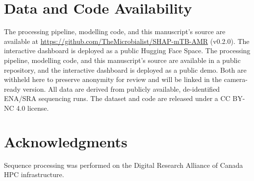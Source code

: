 \section*{Data and Code Availability}

\ifdefined\isaccepted
The processing pipeline, modelling code, and this manuscript's source are available at \url{https://github.com/TheMicrobialist/SHAP-mTB-AMR} (v0.2.0). The interactive dashboard is deployed as a public Hugging Face Space.
\else
The processing pipeline, modelling code, and this manuscript's source are available in a public repository, and the interactive dashboard is deployed as a public demo. Both are withheld here to preserve anonymity for review and will be linked in the camera-ready version.
\fi
All data are derived from publicly available, de-identified ENA/SRA sequencing runs. The dataset and code are released under a CC BY-NC 4.0 license.

\ifdefined\isaccepted
\section*{Acknowledgments}

Sequence processing was performed on the Digital Research Alliance of Canada HPC infrastructure.
\fi
